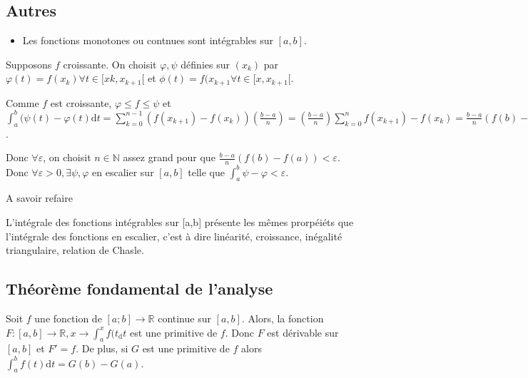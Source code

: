 \documentclass[french]{yLectureNote}
\begin{document}
\subsection{Autres}
\begin{itemize}
 \item Les fonctions monotones ou contnues sont intégrables sur $[a,b]$.
\end{itemize}
\begin{myproof}
Supposons $f$ croissante. On choisit $\varphi,\psi$ définies sur $(x_k)$ par $\varphi(t) = f(x_k)\forall t\in[xk,x_{k+1}[$ et $\phi(t) = f(x_{k+1} \forall t\in[x,x_{k+1}[$.

Comme $f$ est croissante, $\varphi \leq f \leq \psi$ et $\int^b_a(\psi(t)-\varphi(t)\mathrm{d}t = \sum^{n-1}_{k=0} (f(x_{k+1}) - f(x_k))(\frac{b-a}{n}) = (\frac{b-a}{n})\sum^n_{k=0} f(x_{k+1})-f(x_k) = \frac{b-a}{n} (f(b)-f(a))$.

Donc $\forall \varepsilon$, on choisit $n\in\mathbb{N}$ assez grand pour que $\frac{b-a}{n} (f(b)-f(a)) < \varepsilon$. Donc $\forall \varepsilon >0,\exists \psi,\varphi$ en escalier sur $[a,b]$ telle que $\int^b_a\psi-\varphi < \varepsilon$.

A savoir refaire
\end{myproof}
\begin{theorem}[Proposition]
L'intégrale des fonctions intégrables sur [a,b] présente les m\^emes prorpéiéts que l'intégrale des fonctions en escalier, c'est à dire linéarité, croissance, inégalité triangulaire, relation de Chasle.
\end{theorem}
\subsection{Théorème fondamental de l'analyse}
\begin{theorem}[Théorème]
Soit $f$ une fonction de $[a;b]\to\mathbb{R}$ continue sur $[a,b]$. Alors, la fonction $F : [a,b]\to\mathbb{R}, x\to \int^x_a f(t_\mathrm{d}t$ est une primitive de $f$. Donc $F$ est dérivable sur $[a,b]$ et $F'=f$. De plus, si $G$ est une primitive de $f$ alors $\int^b_af(t)\mathrm{d}t = G(b)-G(a)$.
\end{theorem}
\end{document}
